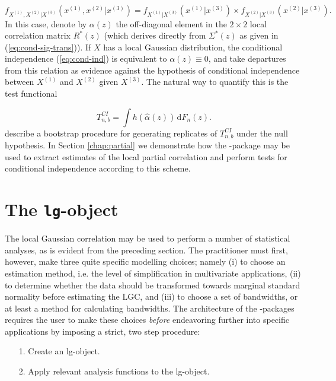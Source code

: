 \begin{equation}
f_{X^{(1)},X^{(2)}|X^{(3)}}\left(x^{(1)}, x^{(2)}|x^{(3)}\right) = f_{X^{(1)}|X^{(3)}}\left(x^{(1)}|x^{(3)}\right) \times f_{X^{(2)}|X^{(3)}}\left(x^{(2)}|x^{(3)}\right).
\label{eq:cond-ind}
\end{equation}
In this case, denote by $\alpha(z)$ the off-diagonal element in the $2\times2$ local correlation matrix $R^*(z)$ (which derives directly from $\Sigma^*(z)$ as given in (\ref{eq:cond-sig-trans})). If $X$ has a local Gaussian distribution, the conditional independence (\ref{eq:cond-ind}) is equivalent to $\alpha(z) \equiv 0$, and \citet{otne:tjos:2019} take departures from this relation as evidence against the hypothesis of conditional independence between $X^{(1)}$ and $X^{(2)}$ given $X^{(3)}$. The natural way to quantify this is the test functional

\begin{equation}
T^{CI}_{n, b} = \int h(\widehat\alpha(z)) \, \textrm{d}F_n(z).
\label{eq:ci-test-statistic}
\end{equation}
\citet{otne:tjos:2019} describe a bootstrap procedure for generating replicates of $T_{n,b}^{CI}$ under the null hypothesis. In Section \ref{chap:partial} we demonstrate how the -package may be used to extract estimates of the local partial correlation and perform tests for conditional independence according to this scheme.

\section{The \texttt{lg}-object} 
\label{chap:lgobject}

The local Gaussian correlation may be used to perform a number of statistical analyses, as is evident from the preceding section. The practitioner must first, however, make three quite specific modelling choices; namely (i) to choose an estimation method, i.e. the level of simplification in multivariate applications, (ii) to determine whether the data should be transformed towards marginal standard normality before estimating the LGC, and (iii) to choose a set of bandwidths, or at least a method for calculating bandwidths. The architecture of the -packages requires the user to make these choices \emph{before} endeavoring further into specific applications by imposing a strict, two step procedure:

\begin{itemize}
\item[1.] Create an lg-object.
\item[2.] Apply relevant analysis functions to the lg-object.
\end{itemize}


